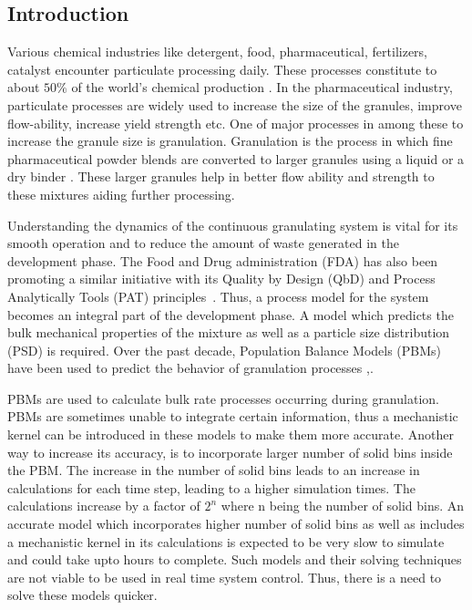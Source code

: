 \documentclass[preprint,10pt,authoryear,review]{elsarticle}
\begin{document}
\begin{linenumbers}
\section{Introduction}
\label{secIntro}
Various chemical industries like detergent, food, pharmaceutical, fertilizers, catalyst encounter particulate processing daily. 
These processes constitute to about $50\%$ of the world's chemical production \citep{seville1997}.
In the pharmaceutical industry, particulate processes are widely used to increase 
the size of the granules, improve flow-ability, increase yield strength etc. One of 
major processes in among these to increase the granule size is granulation. 
Granulation is the process in which fine pharmaceutical powder 
blends are converted to larger granules using a liquid or a dry binder \citep{Chaturbedi2017}. 
These larger granules help in better flow ability and strength to these mixtures 
aiding further processing. 


Understanding the dynamics of the continuous granulating system is vital for its smooth 
operation and to reduce the amount of waste generated in the development phase. The Food 
and Drug administration (FDA) has also been promoting a similar initiative with its 
Quality by Design (QbD) and Process Analytically Tools (PAT) principles~\citep{sen2014}. 
Thus, a process model for the system becomes an integral part of the development phase. 
A model which predicts the bulk mechanical properties of the mixture as well as a particle size 
distribution (PSD) is required. Over the past decade, Population Balance Models (PBMs) have been used 
to predict the behavior of granulation processes \citep{Barrasso2013},\citep{Ramachandran2009}. 

PBMs are used to calculate bulk rate processes occurring during granulation. PBMs are sometimes 
unable to integrate certain information, thus a mechanistic kernel can be 
introduced in these models to make them more accurate. Another way to increase its accuracy, 
is to incorporate larger number of solid bins inside the PBM. The increase in the number of 
solid bins leads to an increase in calculations for each time step, leading to a higher 
simulation times. The calculations increase by a factor of $2^n$ where n being the number 
of solid bins. An accurate model which incorporates higher number of solid bins as well as 
includes a mechanistic kernel in its calculations is expected to be very 
slow to simulate and could take upto hours to complete. Such models and their solving 
techniques are not viable to be used in real time system control. Thus, there is a need to 
solve these models quicker.


\end{linenumbers}
\end{document}
